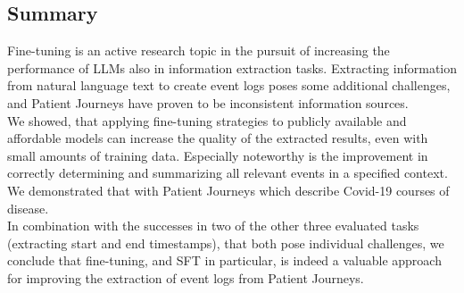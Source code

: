 \subsection{Summary}\label{sec:summary}
Fine-tuning is an active research topic in the pursuit of increasing the performance of LLMs also in information extraction tasks. Extracting information from natural language text to create event logs poses some additional challenges, and Patient Journeys have proven to be inconsistent information sources.\\
We showed, that applying fine-tuning strategies to publicly available and affordable models can increase the quality of the extracted results, even with small amounts of training data. Especially noteworthy is the improvement in correctly determining and summarizing all relevant events in a specified context. We demonstrated that with Patient Journeys which describe Covid-19 courses of disease.\\
In combination with the successes in two of the other three evaluated tasks (extracting start and end timestamps), that both pose individual challenges, we conclude that fine-tuning, and SFT in particular, is indeed a valuable approach for improving the extraction of event logs from Patient Journeys.